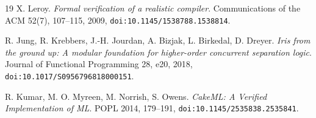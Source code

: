 \begin{thebibliography}{19}
X. Leroy. \emph{Formal verification of a realistic compiler}. Communications of the ACM 52(7), 107--115, 2009, \texttt{doi:10.1145/\allowbreak{}1538788.1538814}.

R. Jung, R. Krebbers, J.-H. Jourdan, A. Bizjak, L. Birkedal, D. Dreyer. \emph{Iris from the ground up: A modular foundation for higher-order concurrent separation logic}. Journal of Functional Programming 28, e20, 2018, \texttt{doi:10.1017/\allowbreak{}S0956796818000151}.

R. Kumar, M. O. Myreen, M. Norrish, S. Owens. \emph{CakeML: A Verified Implementation of ML}. POPL 2014, 179--191, \texttt{doi:10.1145/\allowbreak{}2535838.2535841}.

\end{thebibliography}
